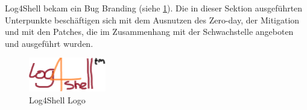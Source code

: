 
Log4Shell bekam ein Bug Branding (siehe \ref{fig:log4shell-logo}). Die in dieser Sektion ausgeführten Unterpunkte beschäftigen
sich mit dem Ausnutzen des Zero-day, der Mitigation und mit den Patches, die im Zusammenhang mit der Schwachstelle angeboten
und ausgeführt wurden.
\begin{figure}[!htb]\label{fig:log4shell-logo}
    \begin{center}
        \includegraphics[width=0.3\textwidth]{images/log4shell-logo}
    \end{center}
    \caption{Log4Shell Logo}
\end{figure}

